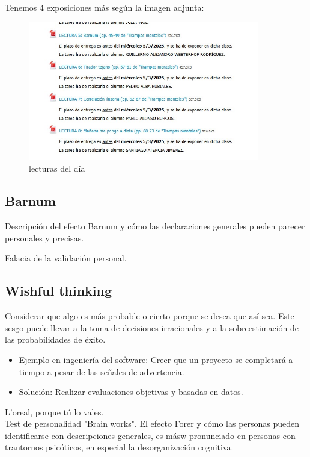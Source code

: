 \documentclass[12pt, a4paper, twoside]{article}
\begin{document}
Tenemos 4 exposiciones más según la imagen adjunta:
\begin{figure}[h]
    \centering
    \includegraphics[width=0.9\textwidth]{./images/0305.jpg}
    \caption{lecturas del día}
\end{figure}

\subsection{Barnum}
Descripción del efecto Barnum y cómo las declaraciones generales pueden parecer personales y precisas.

Falacia de la validación personal.

\subsection{Wishful thinking}
Considerar que algo es más probable o cierto porque se desea que así sea. Este sesgo puede llevar a la toma de decisiones irracionales y a la sobreestimación de las probabilidades de éxito.

\begin{itemize}
    \item{Ejemplo en ingeniería del software: Creer que un proyecto se completará a tiempo a pesar de las señales de advertencia.}
    \item{Solución: Realizar evaluaciones objetivas y basadas en datos.}
\end{itemize}

L'oreal, porque tú lo vales.\\

Test de personalidad "Brain works". El efecto Forer y cómo las personas pueden identificarse con descripciones generales, es másw pronunciado en 
personas con trantornos psicóticos, en especial la desorganización cognitiva.
\end{document}
